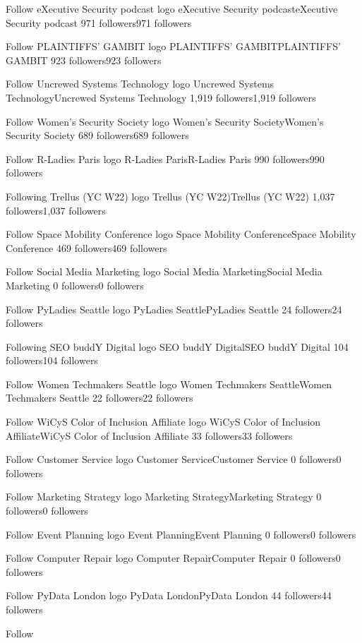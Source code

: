 Follow
eXecutive Security podcast logo
eXecutive Security podcasteXecutive Security podcast
971 followers971 followers

Follow
PLAINTIFFS' GAMBIT logo
PLAINTIFFS' GAMBITPLAINTIFFS' GAMBIT
923 followers923 followers

Follow
Uncrewed Systems Technology logo
Uncrewed Systems TechnologyUncrewed Systems Technology
1,919 followers1,919 followers

Follow
Women's Security Society logo
Women's Security SocietyWomen's Security Society
689 followers689 followers

Follow
R-Ladies Paris logo
R-Ladies ParisR-Ladies Paris
990 followers990 followers

Following
Trellus (YC W22) logo
Trellus (YC W22)Trellus (YC W22)
1,037 followers1,037 followers

Follow
Space Mobility Conference logo
Space Mobility ConferenceSpace Mobility Conference
469 followers469 followers

Follow
Social Media Marketing logo
Social Media MarketingSocial Media Marketing
0 followers0 followers

Follow
PyLadies Seattle logo
PyLadies SeattlePyLadies Seattle
24 followers24 followers

Following
SEO buddY Digital logo
SEO buddY DigitalSEO buddY Digital
104 followers104 followers

Follow
Women Techmakers Seattle logo
Women Techmakers SeattleWomen Techmakers Seattle
22 followers22 followers

Follow
WiCyS Color of Inclusion Affiliate logo
WiCyS Color of Inclusion AffiliateWiCyS Color of Inclusion Affiliate
33 followers33 followers

Follow
Customer Service logo
Customer ServiceCustomer Service
0 followers0 followers

Follow
Marketing Strategy logo
Marketing StrategyMarketing Strategy
0 followers0 followers

Follow
Event Planning logo
Event PlanningEvent Planning
0 followers0 followers

Follow
Computer Repair logo
Computer RepairComputer Repair
0 followers0 followers

Follow
PyData London logo
PyData LondonPyData London
44 followers44 followers

Follow
